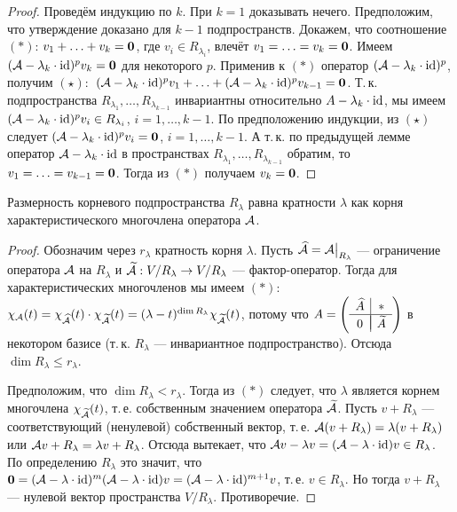 \begin{proof}
    Проведём индукцию по $k$. При $k = 1$ доказывать нечего. Предположим, что утверждение доказано для $k - 1$ подпространств. Докажем, что соотношение $(\ast)$: $v_1 + \ldots + v_k = \boldsymbol{0}$, где $v_i \in R_{\lambda_i}$, влечёт $v_1 = \ldots = v_k = \boldsymbol{0}$. Имеем $(\mathcal{A} - \lambda_k \cdot \mathrm{id})^pv_k = \boldsymbol{0}$ для некоторого $p$. Применив к $(\ast)$ оператор $(\mathcal{A} - \lambda_k \cdot \mathrm{id})^p$, получим $(\star):$ $(\mathcal{A} - \lambda_k \cdot \mathrm{id})^pv_1 + \ldots + (\mathcal{A} - \lambda_k \cdot \mathrm{id})^pv_{k - 1} = \boldsymbol{0}$. Т.\,к. подпространства $R_{\lambda_1}, \ldots, R_{\lambda_{k - 1}}$ инвариантны относительно $A - \lambda_k \cdot \mathrm{id}$, мы имеем $(\mathcal{A} - \lambda_k \cdot \mathrm{id})^pv_i \in R_{\lambda_i}$, $i = 1, \ldots, k - 1$. По предположению индукции, из $(\star)$ следует $(\mathcal{A} - \lambda_k \cdot \mathrm{id})^pv_i = \boldsymbol{0}$, $i = 1, \ldots, k - 1$. А т.\,к. по предыдущей лемме оператор $\mathcal{A} - \lambda_k \cdot \mathrm{id}$ в пространствах $R_{\lambda_1}, \ldots, R_{\lambda_{k - 1}}$ обратим, то $v_1 = \ldots = v_{k - 1} = \boldsymbol{0}$. Тогда из $(\ast)$ получаем $v_k = \boldsymbol{0}$.
\end{proof}

\begin{lemma}
    Размерность корневого подпространства $R_\lambda$ равна кратности $\lambda$ как корня характеристического многочлена оператора $\mathcal{A}$.
\end{lemma}

\begin{proof}
    Обозначим через $r_\lambda$ кратность корня $\lambda$. Пусть $\widehat{\mathcal{A}} = \mathcal{A}\big|_{R_\lambda}$ --- ограничение оператора $\mathcal{A}$ на $R_\lambda$ и $\widetilde{\mathcal{A}}: V / R_\lambda \to V / R_\lambda$ --- фактор-оператор. Тогда для характеристических многочленов мы имеем $(\ast):$ $\chi_{\mathcal{A}}(t) = \chi_{\widehat{\mathcal{A}}}(t) \cdot \chi_{\widetilde{\mathcal{A}}}(t) = (\lambda - t)^{\dim R_\lambda}\chi_{\widetilde{\mathcal{A}}}(t)$, потому что
    $
    A =
    \left(
        \begin{array}{c | c}
            \widehat{A} & \ast\\
            \hline\vspace{-4mm}\\
            0 & \widetilde{A}
        \end{array}
    \right)
    $ в некотором базисе (т.\,к. $R_\lambda$ --- инвариантное подпространство). Отсюда $\dim R_\lambda \leqslant r_\lambda$.

    Предположим, что $\dim R_\lambda < r_\lambda$. Тогда из $(\ast)$ следует, что $\lambda$ является корнем многочлена $\chi_{\widetilde{\mathcal{A}}}(t)$, т.\,е. собственным значением оператора $\widetilde{\mathcal{A}}$. Пусть $v + R_\lambda$ --- соответствующий (ненулевой) собственный вектор, т.\,е. $\mathcal{A}(v + R_\lambda) = \lambda(v + R_\lambda)$ или $\mathcal{A} v + R_\lambda = \lambda v + R_\lambda$. Отсюда вытекает, что $\mathcal{A} v - \lambda v = (\mathcal{A} - \lambda \cdot \mathrm{id})v \in R_\lambda$. По определению $R_\lambda$ это значит, что $\boldsymbol{0} = (\mathcal{A} - \lambda \cdot \mathrm{id})^m(\mathcal{A} - \lambda \cdot \mathrm{id})v = (\mathcal{A} - \lambda \cdot \mathrm{id})^{m + 1}v$, т.\,е. $v \in R_\lambda$. Но тогда $v + R_\lambda$ --- нулевой вектор пространства $V / R_\lambda$. Противоречие.
\end{proof}

